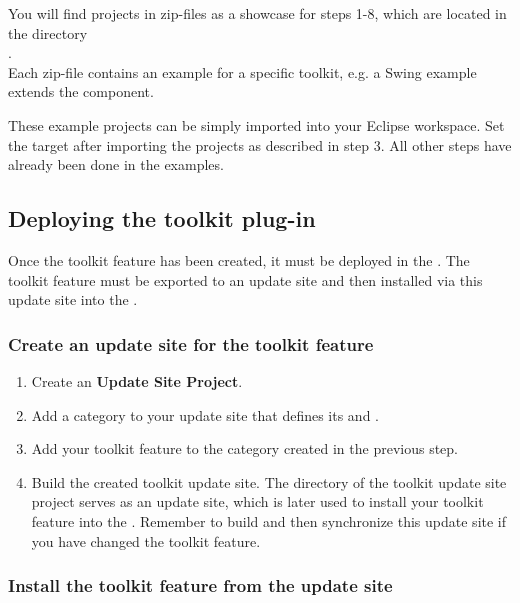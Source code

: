 You will find projects in zip-files as a showcase for steps 1-8, which are
located in the directory\\
.\\
Each zip-file contains an example for a specific toolkit, e.g. a Swing example
extends the  component.

These example projects can be simply imported into your Eclipse workspace. Set
the target after importing the projects as described in step 3. All other steps
have already been done in the examples.

\subsection{Deploying the toolkit plug-in}

Once the toolkit feature has been created, it must be deployed in the \ite{}.
The toolkit feature must be exported to an update site and then installed via
this update site into  the \ite{}.
 
\subsubsection{Create an update site for the toolkit feature}

\begin{enumerate}
\item Create an \textbf{Update Site Project}.
\item Add a category to your update site that defines its  and
      .
\item Add your toolkit feature to the category created in the previous step.
\item Build the created toolkit update site. The directory of the toolkit
      update site project serves as an update site, which is later used to
      install your toolkit feature into the \ite{}. Remember to build and then
      synchronize this update site if you have changed the toolkit feature.
\end{enumerate}

\subsubsection{Install the toolkit feature from the update site}

